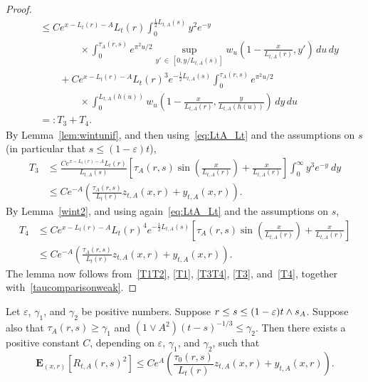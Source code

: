 \documentclass[AHL,Unicode,longabstracts,published]{cedram}
\newcommand*\eps{\varepsilon}
\newcommand*\E{\mathbf{E}}
\newcommand{\1} {\mathds{1}}
\begin{document}
\begin{proof}
\begin{equation}
\begin{split}
&\leq Ce^{x-L_t(r)-A} L_t(r) \int_0^{\frac{1}{2} L_{t,A}(s)} y^2 e^{-y}\\
&\qquad\qquad\times \int_0^{\tau_A(r,s)} e^{\pi^2 u/2} \sup_{y'\,\in\,\left[0, y/L_{t,A}(s)\right]} w_u\left(1-\frac{x}{L_{t,A}(r)}, y' \right)\,du \,dy \\
&\qquad+ Ce^{x-L_t(r)-A} L_t(r)^3 e^{-\frac{1}{2} L_{t,A}(s)} \int_0^{\tau_A(r,s)} e^{\pi^2 u/2} \\
&\qquad \qquad \times \int_0^{L_{t,A}(h(u))} w_u \left(1-\frac{x}{L_{t,A}(r)}, \frac{y}{L_{t,A}(h(u))}\right)\,dy \,du\\
&=: T_3 + T_4.
\end{split}
\end{equation}
By Lemma~\ref{lem:wintunif}, and then using~\eqref{eq:LtA_Lt} and the assumptions on $s$ (in particular that $s \leq (1 - \eps)t$),
\begin{equation}\label{T3}
\begin{split}
T_3 &\leq \frac{C e^{x - L_t(r) - A} L_t(r)}{L_{t,A}(s)} \left[\tau_A(r,s) \sin\left(\frac{x}{L_{t,A}(r)}\right) + \frac x {L_{t,A}(r)}\right] \int_0^{\infty} y^3 e^{-y} \: dy \\
&\leq C e^{-A} \left(\frac{\tau_A(r,s)}{L_t(r)} z_{t,A}(x,r) + y_{t,A}(x,r)\right).
\end{split}
\end{equation}
By Lemma~\ref{wint2}, and using again~\eqref{eq:LtA_Lt} and the assumptions on $s$,
\begin{equation}\label{T4}
\begin{split}
T_4 &\leq Ce^{x-L_t(r)-A} L_t(r)^4 e^{-\frac{1}{2} L_{t,A}(s)} \left[\tau_A(r,s) \sin\left(\frac{x}{L_{t,A}(r)}\right) + \tfrac x {L_{t,A}(r)}\right]\\
&\leq C e^{-A} \left(\frac{\tau_A(r,s)}{L_t(r)} z_{t,A}(x,r) + y_{t,A}(x,r)\right).
\end{split}
\end{equation}
The lemma now follows from~\eqref{T1T2}, \eqref{T1}, \eqref{T3T4}, \eqref{T3}, and~\eqref{T4}, together with~\eqref{taucomparisonweak}.
\end{proof}

\begin{lemm}\label{lem:Rvar}
Let $\eps$, $\gamma_1$, and $\gamma_2$ be positive numbers. Suppose $r \le s \leq \linebreak(1 - \eps) t\wedge s_A$. Suppose also that $\tau_A(r,s) \geq \gamma_1$ and $(1 \vee A^2)(t - s)^{-1/3} \leq \gamma_2$. Then there exists a positive constant $C$, depending on $\eps$, $\gamma_1$, and $\gamma_2$, such that
\[
\E_{(x,r)}\left[R_{t,A}(r,s)^2\right] \le Ce^A\left(\frac{\tau_0(r,s)}{L_t(r)} z_{t,A}(x,r) + y_{t,A}(x,r)\right).
\]
\end{lemm}
\end{document}
